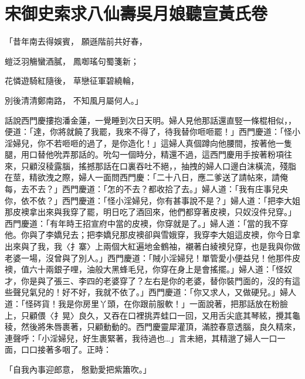 %

\chapter{宋御史索求八仙壽\KG 吳月娘聽宣黃氏卷}


「昔年南去得娛賓，  願遜階前共好春，

螘泛羽觴蠻酒膩，  鳳啣瑤句蜀箋新；

花憐遊騎紅隨後，  草戀征軍碧繞輪，

別後清清鄭南路，  不知風月屬何人。」

話說西門慶摟抱潘金蓮，一覺睡到次日天明。婦人見他那話還直竪一條棍相似，，便道：「達，你將就饒了我罷，我來不得了，待我替你咂咂罷！」西門慶道：「怪小淫婦兒，你不若咂咂的過了，是你造化！」這婦人真個蹲向他腰間，按著他一隻腿，用口替他吮弄那話的。吮勾一個時分，精還不過，這西門慶用手按著粉項往來，只顧沒稜露腦，搖撼那話在口裏吞吐不絕，，抽拽的婦人口邊白沫橫流，殘脂在莖，精欲洩之際，婦人一面問西門慶：「二十八日，應二爹送了請帖來，請俺每，去不去？」西門慶道：「怎的不去？都收拾了去。」婦人道：「我有庄事兒央你，依不依？」西門慶道：「怪小淫婦兒，你有甚事說不是？」婦人道：「把李大姐那皮襖拿出來與我穿了罷，明日吃了酒回來，他們都穿著皮襖，只奴沒件兒穿。」西門慶道：「有年時王招宣府中當的皮襖，你穿就是了。」婦人道：「當的我不穿他。你與了李嬌兒去；把李嬌兒那皮襖卻與雪娥穿，我穿李大姐這皮襖，你今日拿出來與了我，我〈扌寨〉上兩個大紅遍地金鶴袖，襯著白綾襖兒穿，也是我與你做老婆一場，沒曾與了別人。」西門慶道：「賊小淫婦兒！單管愛小便益兒！他那件皮襖，值六十兩銀子哩，油般大黑蜂毛兒，你穿在身上是會搖擺。」婦人道：「怪奴才，你是與了張三、李四的老婆穿了？左右是你的老婆，替你裝門面的，沒的有這些聲兒氣兒的！好不好，我就不依了。」西門慶道：「你又求人，又做硬兒。」婦人道：「怪硶貨！我是你房里丫頭，在你跟前服軟！」一面說著，把那話放在粉臉上，只顧偎〈扌晃〉良久，又吞在口裡挑弄蛙口一回，又用舌尖底其琴絃，攪其龜稜，然後將朱唇裹著，只顧動動的。西門慶靈犀灌頂，滿腔春意透腦，良久精來，連聲呼：「小淫婦兒，好生裹緊著，我待過也…」言未絕，其精邈了婦人一口一面，口口接著多咽了。正時：

「自我內事迎郎意，  慇勤愛把紫簫吹。」

